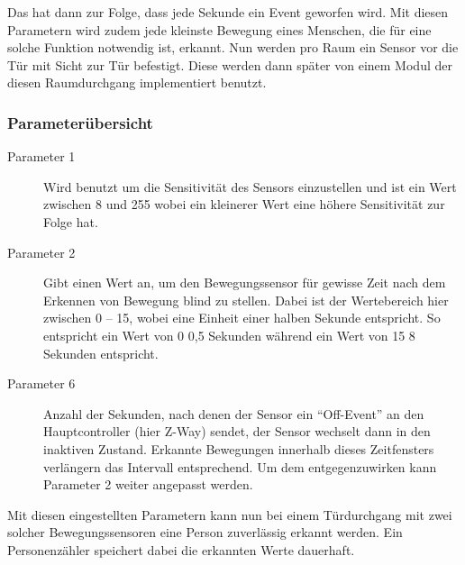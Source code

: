 Das hat dann zur Folge, dass jede Sekunde ein Event geworfen wird. Mit diesen Parametern wird zudem jede kleinste Bewegung eines Menschen, die für eine solche Funktion notwendig ist, erkannt. Nun werden pro Raum ein Sensor vor die Tür mit Sicht zur Tür befestigt. Diese werden dann später von einem Modul der diesen Raumdurchgang implementiert benutzt.

\subsubsection{Parameterübersicht}
\begin{description}
	\item [Parameter 1] Wird benutzt um die Sensitivität des Sensors einzustellen und ist ein Wert zwischen 8 und 255 wobei ein kleinerer Wert eine höhere Sensitivität zur Folge hat.
	\item [Parameter 2] Gibt einen Wert an, um den Bewegungssensor für gewisse Zeit nach dem Erkennen von Bewegung blind zu stellen. Dabei ist der Wertebereich hier zwischen 0 – 15, wobei eine Einheit einer halben Sekunde entspricht. So entspricht ein Wert von 0 0,5 Sekunden während ein Wert von 15 8 Sekunden entspricht.
	\item [Parameter 6] Anzahl der Sekunden, nach denen der Sensor ein "`Off-Event"' an den Hauptcontroller (hier Z-Way) sendet, der Sensor wechselt dann in den inaktiven Zustand. Erkannte Bewegungen innerhalb dieses Zeitfensters verlängern das Intervall entsprechend. Um dem entgegenzuwirken kann Parameter 2 weiter angepasst werden.
\end{description}

Mit diesen eingestellten Parametern kann nun bei einem Türdurchgang mit zwei solcher Bewegungssensoren eine Person zuverlässig erkannt werden. Ein Personenzähler speichert dabei die erkannten Werte dauerhaft. 


